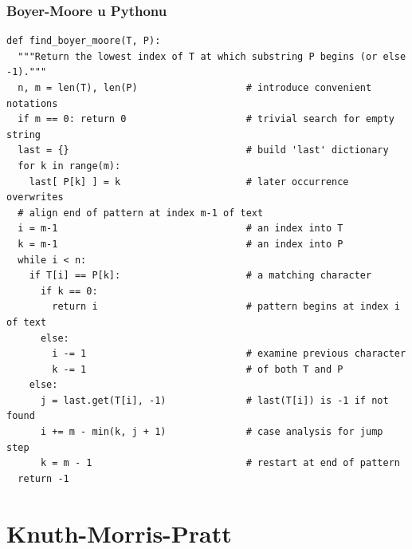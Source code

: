 \documentclass[compress]{beamer}
\begin{document}
\begin{frame}
  \frametitle{Boyer-Moore u Pythonu}
\begin{verbatim}
def find_boyer_moore(T, P):
  """Return the lowest index of T at which substring P begins (or else -1)."""
  n, m = len(T), len(P)                   # introduce convenient notations
  if m == 0: return 0                     # trivial search for empty string
  last = {}                               # build 'last' dictionary
  for k in range(m):
    last[ P[k] ] = k                      # later occurrence overwrites
  # align end of pattern at index m-1 of text
  i = m-1                                 # an index into T
  k = m-1                                 # an index into P
  while i < n:
    if T[i] == P[k]:                      # a matching character
      if k == 0:
        return i                          # pattern begins at index i of text
      else:
        i -= 1                            # examine previous character
        k -= 1                            # of both T and P
    else:
      j = last.get(T[i], -1)              # last(T[i]) is -1 if not found
      i += m - min(k, j + 1)              # case analysis for jump step
      k = m - 1                           # restart at end of pattern
  return -1
\end{verbatim}
\end{frame}

\section[KMP]{Knuth-Morris-Pratt}
\end{document}
